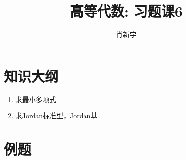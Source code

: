 \documentclass[10pt, a4paper]{article}
\begin{document}
\begin{CJK}{UTF8}{gbsn}
\title{高等代数: 习题课6}
\author{肖新宇}
\maketitle

\section{知识大纲}
\begin{enumerate}[label=(\roman*)]
    \item 求最小多项式
    \item 求Jordan标准型，Jordan基
\end{enumerate}
\section{例题}

\end{CJK}
\end{document}
